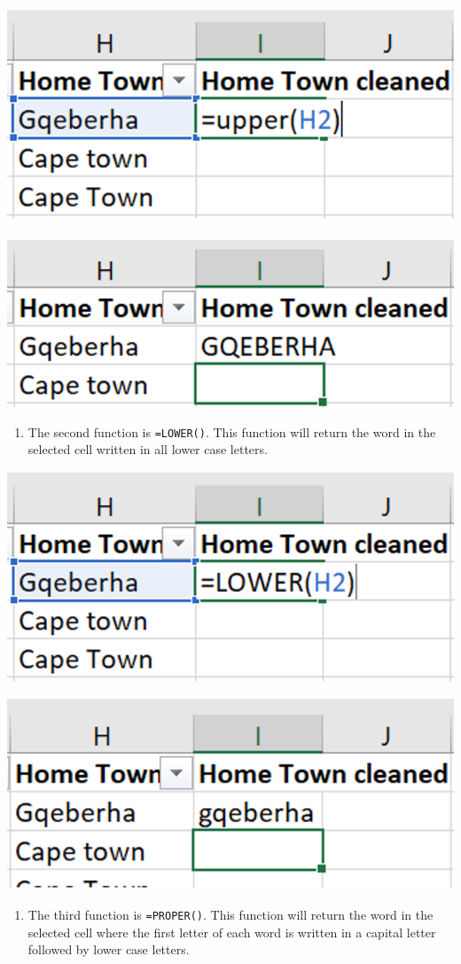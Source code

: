 \documentclass[
]{book}
\providecommand{\tightlist}{%
  \setlength{\itemsep}{0pt}\setlength{\parskip}{0pt}}
\begin{document}
\begin{center}\includegraphics[width=0.4\linewidth]{Figures/capitals_1} \end{center}

\begin{center}\includegraphics[width=0.4\linewidth]{Figures/capitals_2} \end{center}

\begin{enumerate}
\def\labelenumi{\arabic{enumi}.}
\setcounter{enumi}{1}
\tightlist
\item
  The second function is \texttt{=LOWER()}. This function will return the word in the selected cell written in all lower case letters.
\end{enumerate}

\begin{center}\includegraphics[width=0.4\linewidth]{Figures/capitals_3} \end{center}

\begin{center}\includegraphics[width=0.4\linewidth]{Figures/capitals_4} \end{center}

\begin{enumerate}
\def\labelenumi{\arabic{enumi}.}
\setcounter{enumi}{2}
\tightlist
\item
  The third function is \texttt{=PROPER()}. This function will return the word in the selected cell where the first letter of each word is written in a capital letter followed by lower case letters.
\end{enumerate}
\end{document}
